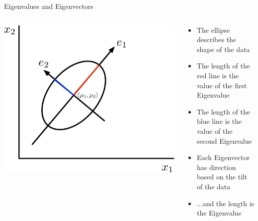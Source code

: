\documentclass[aspectratio=169]{beamer}
\begin{document}
\begin{frame}{Eigenvalues and Eigenvectors}
\begin{columns}
\begin{column}{0.5\textwidth}
\includegraphics[width=1\textwidth]{lectDimRed/mvNormalv2.pdf}
\end{column}
\begin{column}{0.5\textwidth}
\begin{itemize}
\item The ellipse describes the shape of the data
\item The length of the red line is the value of the first Eigenvalue
\item The length of the blue line is the value of the second Eigenvalue
\item Each Eigenvector has direction based on the tilt of the data
\item  ...and the length is the Eigenvalue
\end{itemize}
\end{column}
\end{columns}

\end{frame}
\end{document}
